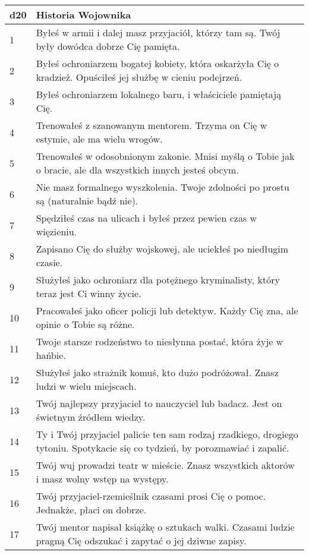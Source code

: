 \begin{table*}[t]
 \centering
 \begin{tabularx}{\textwidth}{| p{} | X |}
  \hline
  \textbf{d20} & \textbf{Historia Wojownika}  \\ \hline
    1 & Byłeś w armii i dalej masz przyjaciół, którzy tam są. Twój były dowódca dobrze Cię pamięta. \\ \hline
    2 & Byłeś ochroniarzem bogatej kobiety, która oskarżyła Cię o kradzież. Opuściłeś jej służbę w cieniu podejrzeń. \\ \hline
    3 & Byłeś ochroniarzem lokalnego baru, i właściciele pamiętają Cię.  \\ \hline
    4 & Trenowałeś z szanowanym mentorem. Trzyma on Cię w estymie, ale ma wielu wrogów. \\ \hline
    5 & Trenowałeś w odosobnionym zakonie. Mnisi myślą o Tobie jak o bracie, ale dla wszystkich innych jesteś obcym. \\ \hline
    6 & Nie masz formalnego wyszkolenia. Twoje zdolności po prostu są (naturalnie bądź nie). \\ \hline
    7 & Spędziłeś czas na ulicach i byłeś przez pewien czas w więzieniu. \\ \hline
    8 & Zapisano Cię do służby wojskowej, ale uciekłeś po niedługim czasie. \\ \hline
    9 & Służyłeś jako ochroniarz dla potężnego kryminalisty, który teraz jest Ci winny życie. \\ \hline
    10 & Pracowałeś jako oficer policji lub detektyw. Każdy Cię zna, ale opinie o Tobie są różne. \\ \hline
    11 & Twoje starsze rodzeństwo to niesłynna postać, która żyje w hańbie.  \\ \hline
    12 & Służyłeś jako strażnik komuś, kto dużo podróżował. Znasz ludzi w wielu miejscach. \\ \hline
    13 & Twój najlepszy przyjaciel to nauczyciel lub badacz. Jest on świetnym źródłem wiedzy. \\ \hline
    14 & Ty i Twój przyjaciel palicie ten sam rodzaj rzadkiego, drogiego tytoniu. Spotykacie się co tydzień, by porozmawiać i zapalić. \\ \hline
    15 & Twój wuj prowadzi teatr w mieście. Znasz wszystkich aktorów i masz wolny wstęp na występy. \\ \hline
    16 & Twój przyjaciel-rzemieślnik czasami prosi Cię o pomoc. Jednakże, płaci on dobrze. \\ \hline
    17 & Twój mentor napisał książkę o sztukach walki. Czasami ludzie pragną Cię odszukać i zapytać o jej dziwne zapisy. \\ \hline

\end{tabularx}
\end{table*}
